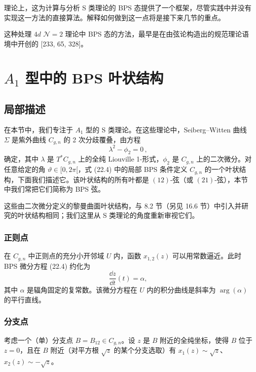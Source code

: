 理论上，这为计算与分析 S 类理论的 BPS 态提供了一个框架，尽管实践中并没有实现这一方法的直接算法。解释如何做到这一点将是接下来几节的重点。

\begin{remark}[22.5]
这种处理 $4d$ $\mathcal{N}=2$ 理论中 BPS 态的方法，最早是在由弦论构造出的规范理论语境中开创的 [233, 65, 328]。
\end{remark}

\section{$A_1$ 型中的 BPS 叶状结构}

\subsection{局部描述}

在本节中，我们专注于 $A_1$ 型的 S 类理论。在这些理论中，Seiberg–Witten 曲线 $\Sigma$ 是紫外曲线 $C_{g,n}$ 的 2 次分歧覆叠，由方程
\begin{equation}
\lambda^2-\phi_2=0\,,\tag{22.6}
\end{equation}
确定，其中 $\lambda$ 是 $T^*C_{g,n}$ 上的全纯 Liouville 1-形式，$\phi_2$ 是 $C_{g,n}$ 上的二次微分。对任意给定的角 $\vartheta\in[0,2\pi[$，式 (22.4) 中的局部 BPS 条件定义 $C_{g,n}$ 的一个叶状结构，下面我们描述它。该叶状结构的所有叶都是 $(12)$-弦（或 $(21)$-弦），本节中我们常把它们简称为 BPS 弦。

\begin{remark}[22.6]
这些由二次微分定义的黎曼曲面叶状结构，与 8.2 节（另见 16.6 节）中引入并研究的叶状结构相同；我们这里从 S 类理论的角度重新审视它们。
\end{remark}

\subsubsection*{正则点}

在 $C_{g,n}$ 中正则点的充分小开邻域 $U$ 内，函数 $x_{1,2}(z)$ 可以用常数逼近。此时 BPS 微分方程 (22.4) 约化为
\[
\frac{\dd z}{\dd t}(t)=\alpha,
\]
其中 $\alpha$ 是辐角固定的复常数。该微分方程在 $U$ 内的积分曲线是斜率为 $\arg(\alpha)$ 的平行直线。

\subsubsection*{分支点}

考虑一个（单）分支点 $B=B_{12}\in C_{g,n}$。设 $z$ 是 $B$ 附近的全纯坐标，使得 $B$ 位于 $z=0$，且在 $B$ 附近（对平方根 $\sqrt{z}$ 的某个分支选取）有 $x_1(z)\sim\sqrt{z}$、$x_2(z)\sim-\sqrt{z}$。

